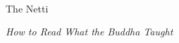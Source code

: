 \pagestyle{empty}
{
\centering

~

\vspace{0.5in}
{\small\scshape \seriesname\par}

\vspace{2in}
{\Huge The Netti\par}
\vspace{10pt}
{\large\itshape How to Read What the Buddha Taught\par}
}
\cleardoublepage
